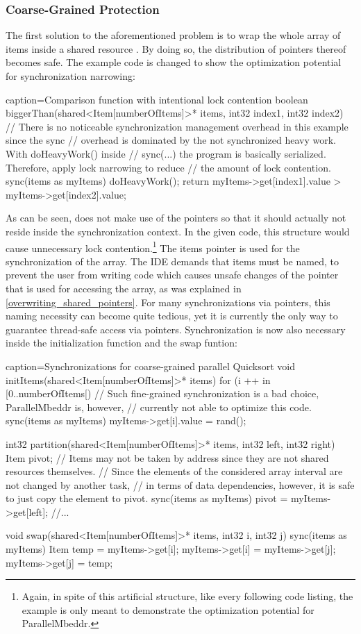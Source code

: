 \subsubsection{Coarse-Grained Protection}
The first solution to the aforementioned problem is to wrap the whole array of items inside a shared resource . By doing so, the distribution of pointers thereof becomes safe. The example code is changed to show the optimization potential for synchronization narrowing:
\begin{ccode}{caption=Comparison function with intentional lock contention}{}
boolean biggerThan(shared<Item[numberOfItems]>* items, int32 index1, int32 index2) { 
  // There is no noticeable synchronization management overhead in this example since the sync 
  // overhead is dominated by the not synchronized heavy work. With doHeavyWork() inside 
  // sync(...) the program is basically serialized. Therefore, apply lock narrowing to reduce 
  // the amount of lock contention. 
  sync(items as myItems) { 
    doHeavyWork(); 
    return myItems->get[index1].value > myItems->get[index2].value; 
  }
}
\end{ccode}
As can be seen,  does not make use of the  pointers so that it should actually not reside inside the synchronization context. In the given code, this structure would cause unnecessary lock contention.\footnote{Again, in spite of this artificial structure, like every following code listing, the example is only meant to demonstrate the optimization potential for ParallelMbeddr.} The items pointer is used for the synchronization of the array. The IDE demands that items must be named, to prevent the user from writing code which causes unsafe changes of the pointer that is used for accessing the array, as was explained in \ref{overwriting_shared_pointers}. For many synchronizations via pointers, this naming necessity can become quite tedious, yet it is currently the only way to guarantee thread-safe access via pointers. Synchronization is now also necessary inside the initialization function and the swap funtion:
\begin{ccode}{caption=Synchronizations for coarse-grained parallel Quicksort}
void initItems(shared<Item[numberOfItems]>* items) { 
  for (i ++ in [0..numberOfItems[) {
    // Such fine-grained synchronization is a bad choice, ParallelMbeddr is, however,
    // currently not able to optimize this code.
    sync(items as myItems) { myItems->get[i].value = rand(); } 
  }
}

int32 partition(shared<Item[numberOfItems]>* items, int32 left, int32 right) { 
  Item pivot;
  // Items may not be taken by address since they are not shared resources themselves.
  // Since the elements of the considered array interval are not changed by another task,
  // in terms of data dependencies, however, it is safe to just copy the element to pivot.
  sync(items as myItems) { pivot = myItems->get[left]; } 
  //...
}

void swap(shared<Item[numberOfItems]>* items, int32 i, int32 j) { 
  sync(items as myItems) { 
    Item temp = myItems->get[i]; 
    myItems->get[i] = myItems->get[j]; 
    myItems->get[j] = temp; 
  } 
}
\end{ccode}

